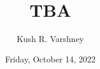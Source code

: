 \documentclass[colloquium]{UAmathtalk}
\author{Kush R. Varshney}
\title{TBA}
\date{Friday, October 14, 2022}
\begin{document}
\maketitle

\begin{abstract}
\end{abstract}
\end{document}
